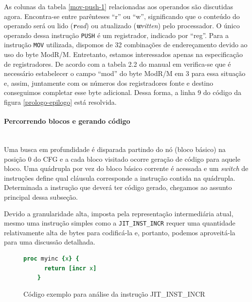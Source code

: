 
As colunas da tabela \ref{mov-push-1} relacionadas aos operandos são
discutidas agora. Encontra-se entre parênteses ``r'' ou ``w'',
significando que o conteúdo do operando será ou lido
(\textit{\textbf{r}ead}) ou atualizado
(\textit{\textbf{w}ritten}) pelo processador. O único operando dessa
instrução \verb!PUSH! é um registrador, indicado por ``reg''. Para a
instrução \verb!MOV! utilizada, dispomos de 32 combinações de
endereçamento devido ao uso do byte ModR/M. Entretanto, estamos
interessados apenas na especificação de registradores. De acordo com a
tabela 2.2 do manual em  verifica-se
que é necessário estabelecer o campo ``mod'' do byte ModR/M em 3 para
essa situação e, assim, juntamente com os números dos registradores fonte e
destino conseguimos completar esse byte adicional. Dessa forma, a
linha 9 do código da figura \ref{prologo-epilogo} está resolvida.


\paragraph{Percorrendo blocos e gerando código}
\quad \\
Uma busca em profundidade é disparada partindo do nó (bloco básico) na posição
0 do CFG e a cada bloco visitado ocorre geração de código para aquele
bloco. Uma quádrupla por vez do bloco básico corrente é acessada e um
\textit{switch} de instruções define qual cláusula corresponde a
instrução contida na quádrupla. Determinada a instrução que deverá ter
código gerado, chegamos ao assunto principal dessa subseção.

Devido a granularidade alta, imposta pela representação intermediária
atual, mesmo uma instrução simples como a \verb!JIT_INST_INCR! requer uma
quantidade relativamente alta de bytes para codificá-la e, portanto,
podemos aproveitá-la para uma discussão detalhada.

\begin{figure}[h]
  \centering
  \begin{lstlisting}[language=Tcl]
    proc myinc {x} {
      return [incr x]
    }
  \end{lstlisting}
  \caption{Código exemplo para análise da instrução JIT\_INST\_INCR \label{myinc}}
\end{figure}

